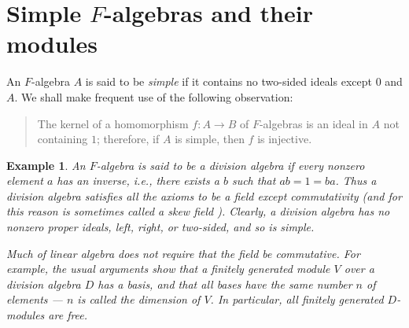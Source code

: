 \documentclass[a4paper,11pt,final]{memoir}%
\newtheorem{example}[X]{Example}
\theoremstyle{nonumberplain}
\begin{document}
\section{Simple \texorpdfstring{$F$}{F}-algebras and their modules}

An $F$-algebra $A$ is said to be \emph{simple\/}%
if it contains no two-sided ideals except $0$ and $A$. We shall make frequent
use of the following observation:

\begin{quote}
The kernel of a homomorphism $f\colon A\rightarrow B$ of $F$-algebras is an
ideal in $A$ not containing $1$; therefore, if $A$ is simple, then $f$ is injective.
\end{quote}

\begin{example}
\label{r12}\label{r14}An $F$-algebra is said to be a \emph{division algebra\/}%
if every nonzero element $a$ has an inverse, i.e., there exists a $b$ such
that $ab=1=ba$. Thus a division algebra satisfies all the axioms to be a field
except commutativity (and for this reason is sometimes called a \emph{skew
field\/}%
%
). Clearly, a division algebra has no nonzero proper ideals, left, right, or
two-sided, and so is simple.

Much of linear algebra does not require that the field be commutative. For
example, the usual arguments show that a finitely generated module $V$ over a
division algebra $D$ has a basis, and that all bases have the same number $n$
of elements --- $n$ is called the \emph{dimension\/}%
of $V$. In particular, all finitely generated $D$-modules are free.
\end{example}
\end{document}
